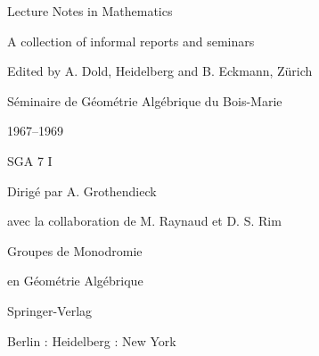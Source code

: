 
\providecommand{\SGASevenSourceGap}[1]{\textit{[lacune visuelle : #1]}}
\providecommand{\SGASevenSourceObstruction}[1]{\textit{[masqué par #1]}}

\begin{center}
Lecture Notes in Mathematics

A collection of informal reports and seminars

Edited by A. Dold, Heidelberg and B. Eckmann, Zürich


\bigskip
Séminaire de Géométrie Algébrique du Bois-Marie

1967--1969

SGA 7 I

Dirigé par A. Grothendieck

avec la collaboration de M. Raynaud et D. S. Rim

\bigskip
Groupes de Monodromie

en Géométrie Algébrique

\bigskip
Springer-Verlag

Berlin : Heidelberg : New York
\end{center}
\clearpage

